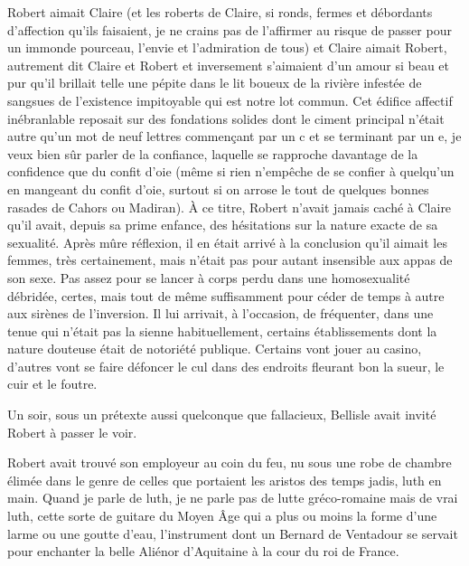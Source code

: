 Robert aimait Claire (et les roberts de Claire, si ronds, fermes et débordants d’affection qu’ils faisaient, je ne crains pas de l’affirmer au risque de passer pour un immonde pourceau, l’envie et l’admiration de tous) et Claire aimait Robert, autrement dit Claire et Robert et inversement s’aimaient d’un amour si beau et pur qu’il brillait telle une pépite dans le lit boueux de la rivière infestée de sangsues de l’existence impitoyable qui est notre lot commun. Cet édifice affectif inébranlable reposait sur des fondations solides dont le ciment principal n’était autre qu’un mot de neuf lettres commençant par un c et se terminant par un e, je veux bien sûr parler de la confiance, laquelle se rapproche davantage de la confidence que du confit d’oie (même si rien n’empêche de se confier à quelqu’un en mangeant du confit d’oie, surtout si on arrose le tout de quelques bonnes rasades de Cahors ou Madiran). À ce titre, Robert n’avait jamais caché à Claire qu’il avait, depuis sa prime enfance, des hésitations sur la nature exacte de sa sexualité. Après mûre réflexion, il en était arrivé à la conclusion qu’il aimait les femmes, très certainement, mais n’était pas pour autant insensible aux appas de son sexe. Pas assez pour se lancer à corps perdu dans une homosexualité débridée, certes, mais tout de même suffisamment pour céder de temps à autre aux sirènes de l’inversion. Il lui arrivait, à l’occasion, de fréquenter, dans une tenue qui n’était pas la sienne habituellement, certains établissements dont la nature douteuse était de notoriété publique. Certains vont jouer au casino, d’autres vont se faire défoncer le cul dans des endroits fleurant bon la sueur, le cuir et le foutre.

Un soir, sous un prétexte aussi quelconque que fallacieux, Bellisle avait invité Robert à passer le voir.

%

Robert avait trouvé son employeur au coin du feu, nu sous une robe de chambre élimée dans le genre de celles que portaient les aristos des temps jadis, luth en main. Quand je parle de luth, je ne parle pas de lutte gréco-romaine mais de vrai luth, cette sorte de guitare du Moyen Âge qui a plus ou moins la forme d’une larme ou une goutte d’eau, l’instrument dont un Bernard de Ventadour se servait pour enchanter la belle Aliénor d’Aquitaine à la cour du roi de France.

